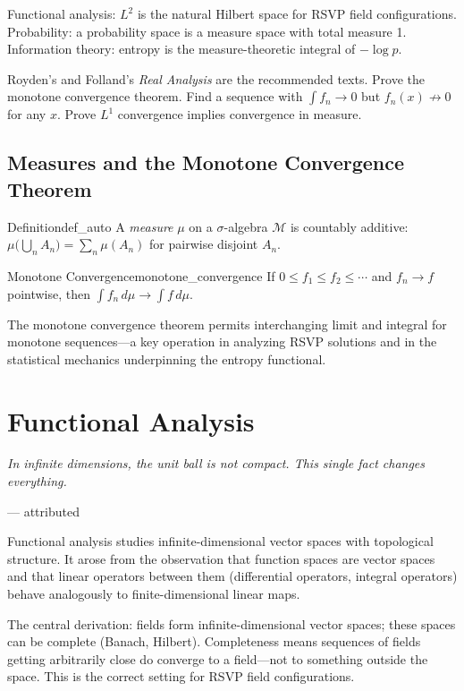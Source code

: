 \documentclass[12pt, twoside, openright, a4paper]{book}
\newcommand{\sidenote}[1]{\marginnote{#1}}
\newcommand{\chapterepigraph}[2]{%
  \vspace{-8pt}\begin{center}\begin{minipage}{0.78\textwidth}
  \small\itshape #1\begin{flushright}--- #2\end{flushright}
  \end{minipage}\end{center}\vspace{10pt}}
\begin{document}
\begin{dependencies}
Functional analysis: $L^2$ is the natural Hilbert space for RSVP field configurations.
Probability: a probability space is a measure space with total measure 1.
Information theory: entropy is the measure-theoretic integral of $-\log p$.
\end{dependencies}

\begin{exercises_box}
Royden's and Folland's \textit{Real Analysis} are the recommended texts.
Prove the monotone convergence theorem.
Find a sequence with $\int f_n \to 0$ but $f_n(x) \not\to 0$ for any $x$.
Prove $L^1$ convergence implies convergence in measure.
\end{exercises_box}

\section{Measures and the Monotone Convergence Theorem}

\begin{definition}{Definition}{def_auto}
A \emph{measure} $\mu$ on a $\sigma$-algebra $\mathcal{M}$ is countably additive: $\mu\bigl(\bigcup_n A_n\bigr) = \sum_n \mu(A_n)$ for pairwise disjoint $A_n$.
\end{definition}

\begin{theorem}{Monotone Convergence}{monotone_convergence}
If $0 \leq f_1 \leq f_2 \leq \cdots$ and $f_n \to f$ pointwise, then $\int f_n\,d\mu \to \int f\,d\mu$.
\end{theorem}

The monotone convergence theorem permits interchanging limit and integral for monotone sequences---a key operation in analyzing RSVP solutions and in the statistical mechanics underpinning the entropy functional.

\chapter{Functional Analysis}
\chapterepigraph{In infinite dimensions, the unit ball is not compact.
This single fact changes everything.}{attributed}
\sidenote{Recommended:\\Kreyszig;\\ Reed--Simon, Vol.\,I}
\label{ch:functional}

\begin{motivation}
Functional analysis studies infinite-dimensional vector spaces with topological structure.
It arose from the observation that function spaces are vector spaces and that linear operators between them (differential operators, integral operators) behave analogously to finite-dimensional linear maps.

The central derivation: fields form infinite-dimensional vector spaces; these spaces can be complete (Banach, Hilbert).
Completeness means sequences of fields getting arbitrarily close do converge to a field---not to something outside the space.
This is the correct setting for RSVP field configurations.
\end{motivation}
\end{document}
